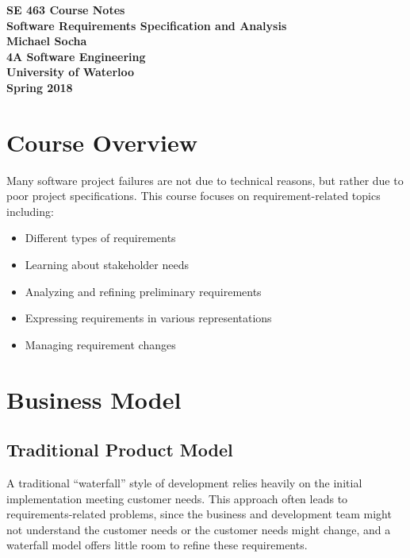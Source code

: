 \documentclass[12pt,titlepage]{article}
\let\stdsection\section
\renewcommand\section{\clearpage\stdsection}
\begin{document}
  \begin{titlepage}
    \vspace*{\fill}
    \centering

    \textbf{\Huge SE 463 Course Notes} \\ [0.4em]
    \textbf{\Large Software Requirements Specification and Analysis} \\ [1em]
    \textbf{\Large Michael Socha} \\ [1em]
    \textbf{\large 4A Software Engineering} \\
    \textbf{\large University of Waterloo} \\
    \textbf{\large Spring 2018} \\
    \vspace*{\fill}
  \end{titlepage}

  \newpage 


  \tableofcontents

  \newpage


  \section{Course Overview}
    Many software project failures are not due to technical reasons, but rather due to poor project specifications. This course
    focuses on requirement-related topics including:
    \begin{itemize}
      \item Different types of requirements
      \item Learning about stakeholder needs
      \item Analyzing and refining preliminary requirements
      \item Expressing requirements in various representations
      \item Managing requirement changes
    \end{itemize}

  \section{Business Model}
    \subsection{Traditional Product Model}
      A traditional ``waterfall'' style of development relies heavily on the initial implementation meeting customer needs. This
      approach often leads to requirements-related problems, since the business and development team might not understand the
      customer needs or the customer needs might change, and a waterfall model offers little room to refine these requirements.
\end{document}
